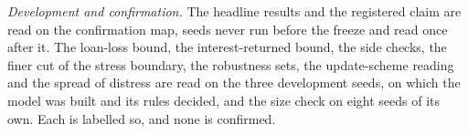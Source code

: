 \emph{Development and confirmation.} The headline results and the registered claim are read on the confirmation
map, \SeedsConfirm{} seeds never run before the freeze and read once after it. The loan-loss bound, the
interest-returned bound, the side checks, the finer cut of the stress boundary, the robustness sets, the
update-scheme reading and the spread of distress are read on the three development seeds, on which the model was
built and its rules decided, and the size check on eight seeds of its own. Each is labelled so, and none is
confirmed.
